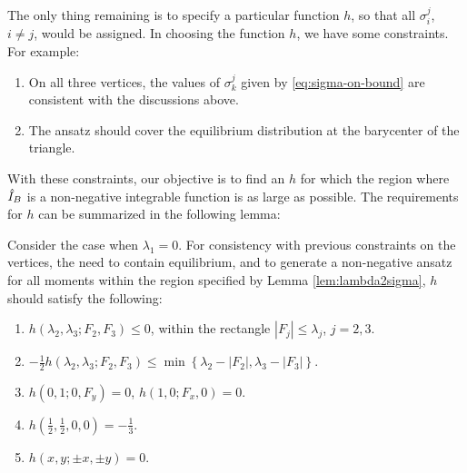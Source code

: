 The only thing remaining is to specify a particular
function $h$, so that all $\sigma_i^j$, $i \neq j$, would be assigned. In
choosing the function $h$, we have some constraints. For example:
\begin{enumerate}
\item On all three vertices, the values of $\sigma^j_k$ given by
  \eqref{eq:sigma-on-bound} are consistent with the discussions
  above.
\item The ansatz should cover the equilibrium distribution at the
  barycenter of the triangle.
\end{enumerate}
With these constraints, our objective is to find an $h$ for which the region
where $\hat I_B$ is a non-negative integrable function is as large as 
possible. The requirements for $h$ can be summarized in the
following lemma:
\begin{lemma}\label{lem:requirements-h}
  Consider the case when $\lambda_1 = 0$.  For consistency with
  previous constraints on the vertices, the need to contain
  equilibrium, and to generate a non-negative ansatz for all moments
  within the region specified by Lemma \ref{lem:lambda2sigma}, $h$
  should satisfy the following:
  \begin{enumerate}
  \item \label{item:sign-h} $h(\lambda_2,\lambda_3; F_2, F_3) \leq 0$,
    within the rectangle $|F_j| \leq \lambda_j$, $j = 2,3$.
  \item \label{item:value-h} $-\frac12 h(\lambda_2,\lambda_3; F_2,F_3) \leq 
    \min\left\{\lambda_2 - |F_2|, \lambda_3 - |F_3|\right\}$.
  \item\label{item:vertex} $h(0,1; 0,F_y) = 0$, $h(1,0; F_x,0) = 0$.
  \item \label{item:equilibrium} $h(\frac12,\frac12,0,0) = -\frac13$.
  \item \label{item:boundary} $h(x, y; \pm x,\pm y) = 0$.
  \end{enumerate}
\end{lemma}
